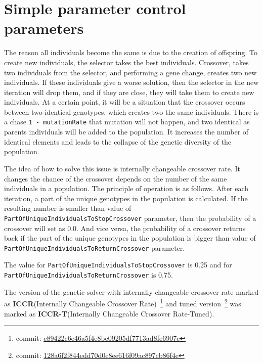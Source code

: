 \section{Simple parameter control parameters}

The reason all individuals become the same is due to the creation of offspring. To create new individuals, the selector takes the best individuals. Crossover, takes two individuals from the selector, and performing a gene change, creates two new individuals. If these individuals give a worse solution, then the selector in the new iteration will drop them, and if they are close, they will take them to create new individuals. At a certain point, it will be a situation that the crossover occurs between two identical genotypes, which creates two the same individuals. There is a chase \texttt{1~-~mutationRate} that mutation will not happen, and two identical as parents individuals will be added to the population. It increases the number of identical elements and leads to the collapse of the genetic diversity of the population.

The idea of how to solve this issue is internally changeable crossover rate. It changes the chance of the crossover depends on the number of the same individuals in a population. 
The principle of operation is as follows. After each iteration, a part of the unique genotypes in the population is calculated. If the resulting number is smaller than value of \texttt{PartOfUniqueIndividualsToStopCrossover} parameter, then the probability of a crossover will set as 0.0. And vice versa, the probability of a crossover returns back if the part of the unique genotypes in the population is bigger than value of \texttt{PartOfUniqueIndividualsToReturnCrossover} parameter.

The value for \texttt{PartOfUniqueIndividualsToStopCrossover} is 0.25 and for \texttt{PartOfUniqueIndividualsToReturnCrossover} is 0.75.

The version of the genetic solver with internally changeable crossover rate marked as \textbf{ICCR}(Internally Changeable Crossover Rate)~\footnote{commit: \href{https://git-st.inf.tu-dresden.de/mquat/mquat2/commit/c89422c6e46a5f4e8bc09205df7713ad8fe6907c}{c89422c6e46a5f4e8bc09205df7713ad8fe6907c}} and tuned version~\footnote{commit: \href{https://git-st.inf.tu-dresden.de/mquat/mquat2/commit/128a6f2f844edd70d0e8ee616f09ac897cb86f4e}{128a6f2f844edd70d0e8ee616f09ac897cb86f4e}} was marked as \textbf{ICCR-T}(Internally Changeable Crossover Rate-Tuned).

